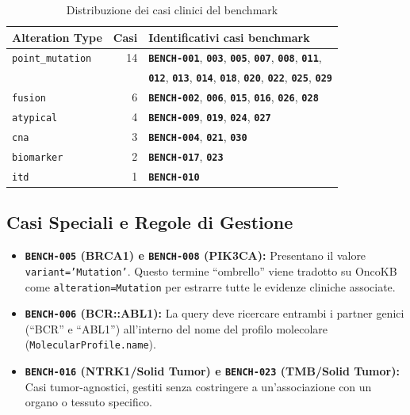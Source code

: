 \documentclass[12pt, a4paper]{article}
\newcommand{\bench}[1]{{\texttt{\textbf{#1}}}}
\begin{document}
\begin{table}[ht]
\centering\renewcommand{\arraystretch}{1.3}
\caption{Distribuzione dei casi clinici del benchmark}
\begin{tabular}{lrl}
\toprule
\rowcolor{primaryblue}
\color{white}\textbf{Alteration Type} & \color{white}\textbf{Casi} & \color{white}\textbf{Identificativi casi benchmark} \\
\midrule
\texttt{point\_mutation} & 14 & \bench{BENCH-001}, \bench{003}, \bench{005}, \bench{007}, \bench{008}, \bench{011}, \\
 & & \bench{012}, \bench{013}, \bench{014}, \bench{018}, \bench{020}, \bench{022}, \bench{025}, \bench{029} \\
\rowcolor{roweven}
\texttt{fusion} & 6 & \bench{BENCH-002}, \bench{006}, \bench{015}, \bench{016}, \bench{026}, \bench{028} \\
\texttt{atypical} & 4 & \bench{BENCH-009}, \bench{019}, \bench{024}, \bench{027} \\
\rowcolor{roweven}
\texttt{cna} & 3 & \bench{BENCH-004}, \bench{021}, \bench{030} \\
\texttt{biomarker} & 2 & \bench{BENCH-017}, \bench{023} \\
\rowcolor{roweven}
\texttt{itd} & 1 & \bench{BENCH-010} \\
\bottomrule
\end{tabular}
\end{table}

\subsection{Casi Speciali e Regole di Gestione}
\begin{itemize}[leftmargin=1.6em, itemsep=3pt]
  \item \textbf{\bench{BENCH-005} (BRCA1) e \bench{BENCH-008} (PIK3CA):} Presentano il valore \texttt{variant='Mutation'}. Questo termine ``ombrello'' viene tradotto su OncoKB come \texttt{alteration=Mutation} per estrarre tutte le evidenze cliniche associate.
  \item \textbf{\bench{BENCH-006} (BCR::ABL1):} La query deve ricercare entrambi i partner genici (``BCR'' e ``ABL1'') all'interno del nome del profilo molecolare (\texttt{MolecularProfile.name}).
  \item \textbf{\bench{BENCH-016} (NTRK1/Solid Tumor) e \bench{BENCH-023} (TMB/Solid Tumor):} Casi tumor-agnostici, gestiti senza costringere a un'associazione con un organo o tessuto specifico.
\end{itemize}
\end{document}

